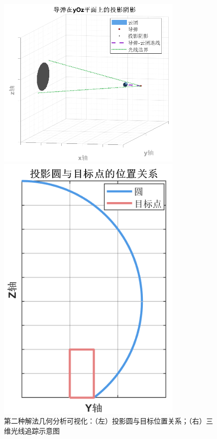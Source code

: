 \begin{figure}[htbp]
\centering
\begin{minipage}{0.48\textwidth}
\centering
\includegraphics[width=0.8\textwidth]{figures/A_1_2.png}
\end{minipage}
\hfill
\begin{minipage}{0.48\textwidth}
\centering
\includegraphics[width=0.8\textwidth]{figures/A_1_3.png}
\end{minipage}
\caption{第二种解法几何分析可视化：（左）投影圆与目标位置关系；（右）三维光线追踪示意图}
\label{fig:q1_method2_visualization}
\end{figure}